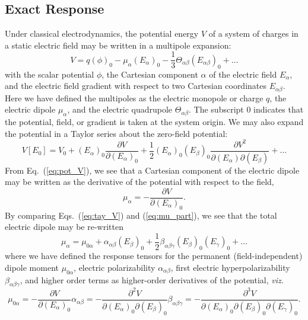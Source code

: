\subsection{Exact Response} \label{ss:exact}
Under classical electrodynamics, the potential energy $V$ of a system of charges in a static electric field 
may be written in a multipole expansion:
\begin{equation} \label{eq:pot_V}
V = q(\phi)_0 - \mu_\alpha(E_\alpha)_0 - \frac{1}{3}\Theta_{\alpha\beta}(E_{\alpha\beta})_0 + \ldots
\end{equation}
with the scalar potential $\phi$, the Cartesian component $\alpha$ of the electric field $E_\alpha$, and the electric field gradient with respect to two Cartesian coordinates $E_{\alpha\beta}$. Here we have defined the multipoles as the electric monopole or charge $q$, the electric dipole $\mu_\alpha$, and the electric quadrupole $\Theta_{\alpha\beta}$. The subscript $0$ indicates that the potential, field, or gradient is taken at the system origin.
We may also expand the potential in a Taylor series about the zero-field potential:
\begin{equation} \label{eq:tay_V}
    V[E_0] = V_0 + (E_\alpha)_0\frac{\partial V}{\partial (E_\alpha)_0} + \frac{1}{2}(E_\alpha)_0(E_\beta)_0\frac{\partial V^2}{\partial (E_\alpha) \partial (E_\beta)} + \ldots
\end{equation}
From Eq.~(\ref{eq:pot_V}), we see that a Cartesian component of the electric dipole may be written as the derivative of the potential with respect to the field, 
\begin{equation} \label{eq:mu_part}
    \mu_\alpha = -\frac{\partial V}{\partial (E_\alpha)_0}.
\end{equation}
By comparing Eqs.~(\ref{eq:tay_V}) and (\ref{eq:mu_part}), we see that the total electric dipole may be re-written 
\begin{equation} \label{eq:mu_tot}
\mu_\alpha = \mu_{0\alpha} + \alpha_{\alpha\beta}(E_\beta)_0 + \frac{1}{2}\beta_{\alpha\beta\gamma}(E_\beta)_0(E_\gamma)_0 + \ldots
\end{equation}
where we have defined the response tensors for the permanent (field-independent) dipole moment $\mu_{0\alpha}$, electric polarizability $\alpha_{\alpha\beta}$, first electric hyperpolarizability $\beta_{\alpha\beta\gamma}$, and higher order terms as higher-order derivatives of the potential, \textit{viz.}
\begin{subequations} \label{eq:derivs}
    \begin{equation} \label{eq:mu_0}
    \mu_{0\alpha} = -\frac{\partial V}{\partial (E_\alpha)_0}
    \end{equation}

    \begin{equation} \label{eq:alpha}
    \alpha_{\alpha\beta} = -\frac{\partial^2 V}{\partial (E_\alpha)_0 \partial (E_\beta)_0}
    \end{equation}

    \begin{equation} \label{eq:beta}
    \beta_{\alpha\beta\gamma} = -\frac{\partial^3 V}{\partial (E_\alpha)_0 \partial (E_\beta)_0 \partial (E_\gamma)_0}.
    \end{equation}
\end{subequations}
